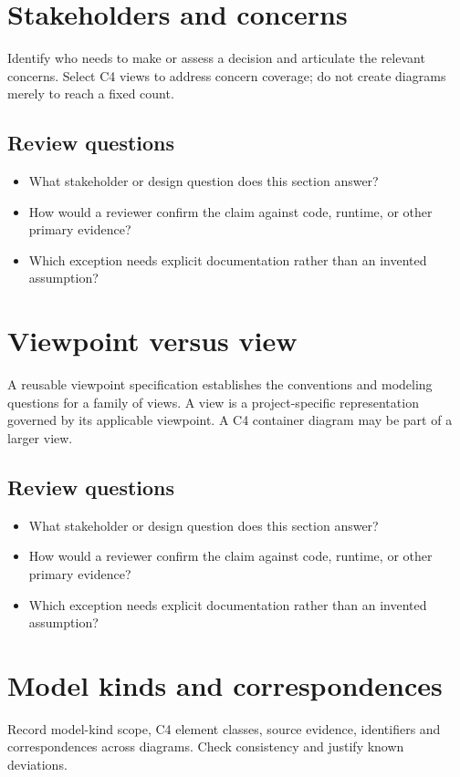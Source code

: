 \documentclass[10pt,letterpaper]{article}
\begin{document}
\section{Stakeholders and concerns}
Identify who needs to make or assess a decision and articulate the relevant concerns. Select C4 views to address concern coverage; do not create diagrams merely to reach a fixed count.


\subsection{Review questions}
\begin{itemize}
\item What stakeholder or design question does this section answer?
\item How would a reviewer confirm the claim against code, runtime, or other primary evidence?
\item Which exception needs explicit documentation rather than an invented assumption?
\end{itemize}

\section{Viewpoint versus view}
A reusable viewpoint specification establishes the conventions and modeling questions for a family of views. A view is a project-specific representation governed by its applicable viewpoint. A C4 container diagram may be part of a larger view.


\subsection{Review questions}
\begin{itemize}
\item What stakeholder or design question does this section answer?
\item How would a reviewer confirm the claim against code, runtime, or other primary evidence?
\item Which exception needs explicit documentation rather than an invented assumption?
\end{itemize}

\section{Model kinds and correspondences}
Record model-kind scope, C4 element classes, source evidence, identifiers and correspondences across diagrams. Check consistency and justify known deviations.
\end{document}
